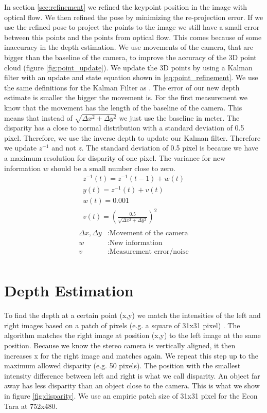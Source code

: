 \documentclass[11pt,a4paper,titlepage,oneside]{report}
\begin{document}
In section \ref{sec:refinement} we refined the keypoint position in the image with optical flow. We then refined the pose by minimizing the re-projection error. If we use the refined pose to project the points to the image we still have a small error between this points and the points from optical flow. This comes because of some inaccuracy in the depth estimation. We use movements of the camera, that are bigger than the baseline of the camera, to improve the accuracy of the 3D point cloud (figure \ref{fig:point_update}). We update the 3D points by using a Kalman filter with an update and state equation shown in \ref{eq:point_refinement}. We use the same definitions for the Kalman Filter as \cite{statdig}. The error of our new depth estimate is smaller the bigger the movement is. For the first measurement we know that the movement has the length of the baseline of the camera. This means that instead of $\sqrt{\Delta x^2+\Delta y^2}$ we just use the baseline in meter. The disparity has a close to normal distribution with a standard deviation of 0.5 pixel. Therefore, we use the inverse depth to update our Kalman filter. Therefore we update $z^{-1}$ and not $z$. The standard deviation of 0.5 pixel is because we have a maximum resolution for disparity of one pixel. The variance for new information $w$ should be a small number close to zero.
\begin{equation}\label{eq:point_refinement}
  \begin{gathered}
    z^{-1}(t)=z^{-1}(t-1)+w(t)\\
    y(t)=z^{-1}(t)+v(t)\\
    w(t)=0.001\\
    v(t)=(\frac{0.5}{\sqrt{\Delta x^2 + \Delta y^2}})^2\\
  \end{gathered}
\end{equation}
\begin{align*}
  \Delta x, \Delta y  &: \text{Movement of the camera}\\
  w                   &: \text{New information}\\
  v                   &: \text{Measurement error/noise}\\
\end{align*}

\chapter{Depth Estimation}\label{ch:depth}

To find the depth at a certain point (x,y) we match the intensities of the left and right images based on a patch of pixels (e.g. a square of 31x31 pixel) \cite{rvc}. The algorithm matches the right image at position (x,y) to the left image at the same position. Because we know the stereo camera is vertically aligned, it then increases x for the right image and matches again. We repeat this step up to the maximum allowed disparity (e.g. 50 pixels). The position with the smallest intensity difference between left and right is what we call disparity. An object far away has less disparity than an object close to the camera. This is what we show in figure \ref{fig:disparity}. We use an empiric patch size of 31x31 pixel for the Econ Tara at 752x480.
\end{document}
